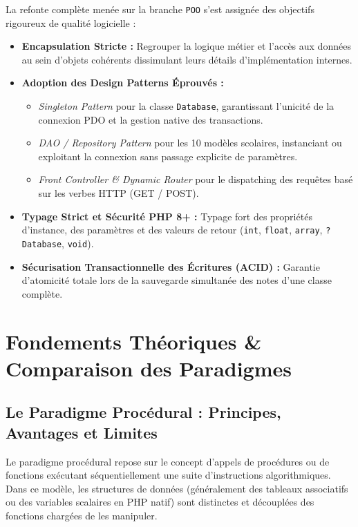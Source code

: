 \documentclass[11pt,a4paper,oneside]{report}
\begin{document}
La refonte complète menée sur la branche \texttt{POO} s'est assignée des objectifs rigoureux de qualité logicielle :
\begin{itemize}[label=\textcolor{primaryMed}{\textbullet}]
    \item \textbf{Encapsulation Stricte :} Regrouper la logique métier et l'accès aux données au sein d'objets cohérents dissimulant leurs détails d'implémentation internes.
    \item \textbf{Adoption des Design Patterns Éprouvés :}
    \begin{itemize}
        \item \textit{Singleton Pattern} pour la classe \texttt{Database}, garantissant l'unicité de la connexion PDO et la gestion native des transactions.
        \item \textit{DAO / Repository Pattern} pour les 10 modèles scolaires, instanciant ou exploitant la connexion sans passage explicite de paramètres.
        \item \textit{Front Controller \& Dynamic Router} pour le dispatching des requêtes basé sur les verbes HTTP (GET / POST).
    \end{itemize}
    \item \textbf{Typage Strict et Sécurité PHP 8+ :} Typage fort des propriétés d'instance, des paramètres et des valeurs de retour (\texttt{int}, \texttt{float}, \texttt{array}, \texttt{?Database}, \texttt{void}).
    \item \textbf{Sécurisation Transactionnelle des Écritures (ACID) :} Garantie d'atomicité totale lors de la sauvegarde simultanée des notes d'une classe complète.
\end{itemize}

\chapter{Fondements Théoriques \& Comparaison des Paradigmes}
\label{chap:paradigmes}

\section{Le Paradigme Procédural : Principes, Avantages et Limites}

Le paradigme procédural repose sur le concept d'appels de procédures ou de fonctions exécutant séquentiellement une suite d'instructions algorithmiques. Dans ce modèle, les structures de données (généralement des tableaux associatifs ou des variables scalaires en PHP natif) sont distinctes et découplées des fonctions chargées de les manipuler.
\end{document}
